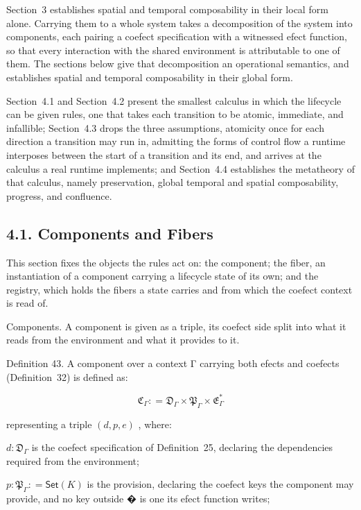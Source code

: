 \documentclass[
  10
]{article}
\begin{document}
Section~3 establishes spatial and temporal composability in their local
form alone. Carrying them to a whole system takes a decomposition of the
system into components, each pairing a coefect specification with a
witnessed efect function, so that every interaction with the shared
environment is attributable to one of them. The sections below give that
decomposition an operational semantics, and establishes spatial and
temporal composability in their global form.

Section~4.1 and Section~4.2 present the smallest calculus in which the
lifecycle can be given rules, one that takes each transition to be
atomic, immediate, and infallible; Section~4.3 drops the three
assumptions, atomicity once for each direction a transition may run in,
admitting the forms of control flow a runtime interposes between the
start of a transition and its end, and arrives at the calculus a real
runtime implements; and Section~4.4 establishes the metatheory of that
calculus, namely preservation, global temporal and spatial
composability, progress, and confluence.

\subsection{4.1. Components and Fibers}\label{components-and-fibers}

This section fixes the objects the rules act on: the component; the
fiber, an instantiation of a component carrying a lifecycle state of its
own; and the registry, which holds the fibers a state carries and from
which the coefect context is read of.

Components. A component is given as a triple, its coefect side split
into what it reads from the environment and what it provides to it.

Definition 43. A component over a context Γ carrying both efects and
coefects (Definition~32) is defined as:

\[
\mathfrak { C } _ { \Gamma } : = \mathfrak { D } _ { \Gamma } \times \mathfrak { P } _ { \Gamma } \times \mathfrak { E } _ { \Gamma } ^ { * }\tag{37}
\]

representing a triple \(( d , p , e )\) , where:

\(d : { \mathfrak { D } } _ { \Gamma }\) is the coefect specification of
Definition~25, declaring the dependencies required from the environment;

\(p : \mathfrak { P } _ { \Gamma } : = \mathsf { S e t } ( K )\) is the
provision, declaring the coefect keys the component may provide, and no
key outside � is one its efect function writes;
\end{document}
